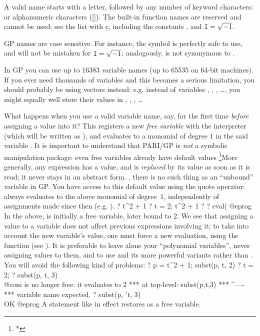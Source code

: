 \label{se:varname} A valid name starts with a letter,
followed by any number of keyword characters: \kbd{\_} or alphanumeric
characters ([]). The built-in function names are reserved and
cannot be used; see the list with \b{c}, including the constants ,
 and ${\tt I}=\sqrt{-1}$.

GP names are case sensitive. For instance, the symbol  is perfectly
safe to use, and will not be mistaken for ${\tt I} = \sqrt{-1}$; analogously,
 is not synonymous to .

In GP you can use up to 16383 variable names (up to 65535 on 64-bit
machines). If you ever need thousands of variables and this becomes a serious
limitation, you should probably be using vectors instead: e.g. instead of
variables , , , \dots, you might equally well store
their values in , , , \dots

What happens when you use a valid variable name, say, for the first
time \emph{before} assigning a value into it? This registers a new
\emph{free variable} with the interpreter (which will be written as ),
and evaluates to a monomial of degree $1$ in the said variable . It is
important to understand that PARI/GP is \emph{not} a symbolic manipulation
package: even free variables already have default values%
\footnote{*}{More generally, any expression has a value, and is
\emph{replaced} by its value as soon as it is read; it never stays in an
abstract form.}%
, there is no such thing as an ``unbound'' variable in GP.
You have access to this default value using the quote operator: 
always evaluates to the above monomial of degree~$1$, independently of
assignments made since then (e.g. ).
%
\bprog
? t^2 + 1
? t = 2; t^2 + 1
? %
? eval(%
@eprog\noindent
In the above,  is initially a free variable, later bound to $2$. We
see that assigning a value to a variable does not affect previous expressions
involving it; to take into account the new variable's value, one must force a
new evaluation, using the function  (see ). It is
preferable to leave alone your ``polynomial variables'', never assigning
values to them, and to use  and its more powerful variants rather
than . You will avoid the following kind of problems:
\bprog
? p = t^2 + 1; subst(p, t, 2)
? t = 2;
? subst(p, t, 3)    \\@com {} is no longer free: it evaluates to 2
  ***   at top-level: subst(p,t,3)
  ***                         ^----
  ***   variable name expected.
? subst(p, 't, 3)   \\ OK
@eprog\noindent
A statement like  in effect restores  as a free variable.

